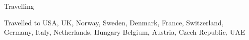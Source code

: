 

\begin{cventries}

  \cventry
    {} %
    {Travelling} %
    {} %
    {} %
    {
      \begin{cvitems} %
        \item {Travelled to USA, UK, Norway, Sweden, Denmark, France, Switzerland, Germany, Italy, Netherlands, Hungary Belgium, Austria, Czech Republic, UAE}
      \end{cvitems}
    }


\end{cventries}
